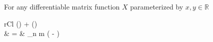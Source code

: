 \begin{corollary}
	For any differentiable matrix function $X$ parameterized by $x,y \in \mathbb{R}$
	\begin{IEEEeqnarray*}{rCl}
		{
			\left[\frac{\partial}{\partial x} \sum_{n=1}^\infty \frac{1}{\left(n+1\right)!} \operatorname{ad}_X^n \cdotp \right]\left(\right)
			+ \left[\frac{\partial}{\partial y} \sum_{n=1}^\infty \frac{1}{\left(n+1\right)!} \operatorname{ad}_X^n \cdotp \right]\left(\right)
		}\\\quad
			& = & \sum_{n \ge m }  \left( -  \right) 
	\end{IEEEeqnarray*}
\end{corollary}
